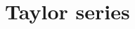 \documentclass[../book/calcnotes.tex]{subfiles}
\begin{document}
\section{Taylor series}
\label{sec:taylor-series.intro}

\begin{exercises}
\end{exercises}
\end{document}
